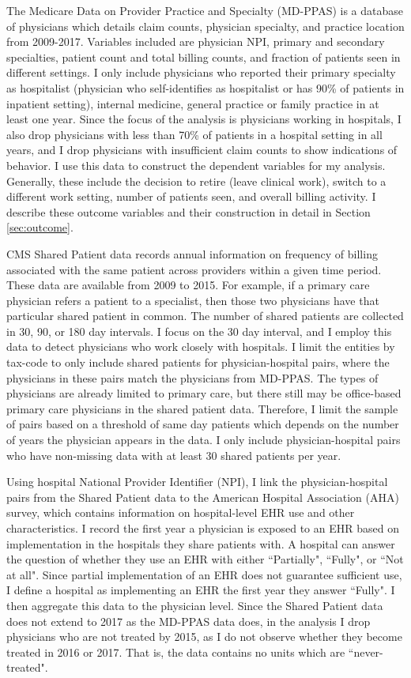 \documentclass[12pt]{article}
\begin{document}
The Medicare Data on Provider Practice and Specialty (MD-PPAS) is a database of physicians which details claim counts, physician specialty, and practice location from 2009-2017. Variables included are physician NPI, primary and secondary specialties, patient count and total billing counts, and fraction of patients seen in different settings. I only include physicians who reported their primary specialty as hospitalist (physician who self-identifies as hospitalist or has 90\% of patients in inpatient setting), internal medicine, general practice or family practice in at least one year. Since the focus of the analysis is physicians working in hospitals, I also drop physicians with less than 70\% of patients in a hospital setting in all years, and I drop physicians with insufficient claim counts to show indications of behavior. I use this data to construct the dependent variables for my analysis. Generally, these include the decision to retire (leave clinical work), switch to a different work setting, number of patients seen, and overall billing activity. I describe these outcome variables and their construction in detail in Section \ref{sec:outcome}.


CMS Shared Patient data records annual information on frequency of billing associated with the same patient across providers within a given time period. These data are available from 2009 to 2015. For example, if a primary care physician refers a patient to a specialist, then those two physicians have that particular shared patient in common. The number of shared patients are collected in 30, 90, or 180 day intervals. I focus on the 30 day interval, and I employ this data to detect physicians who work closely with hospitals. I limit the entities by tax-code to only include shared patients for physician-hospital pairs, where the physicians in these pairs match the physicians from MD-PPAS. The types of physicians are already limited to primary care, but there still may be office-based primary care physicians in the shared patient data. Therefore, I limit the sample of pairs based on a threshold of same day patients which depends on the number of years the physician appears in the data. I only include physician-hospital pairs who have non-missing data with at least 30 shared patients per year.


Using hospital National Provider Identifier (NPI), I link the physician-hospital pairs from the Shared Patient data to the American Hospital Association (AHA) survey, which contains information on hospital-level EHR use and other characteristics. I record the first year a physician is exposed to an EHR based on implementation in the hospitals they share patients with. A hospital can answer the question of whether they use an EHR with either ``Partially", ``Fully", or ``Not at all". Since partial implementation of an EHR does not guarantee sufficient use, I define a hospital as implementing an EHR the first year they answer ``Fully". I then aggregate this data to the physician level. Since the Shared Patient data does not extend to 2017 as the MD-PPAS data does, in the analysis I drop physicians who are not treated by 2015, as I do not observe whether they become treated in 2016 or 2017. That is, the data contains no units which are ``never-treated".
\end{document}
